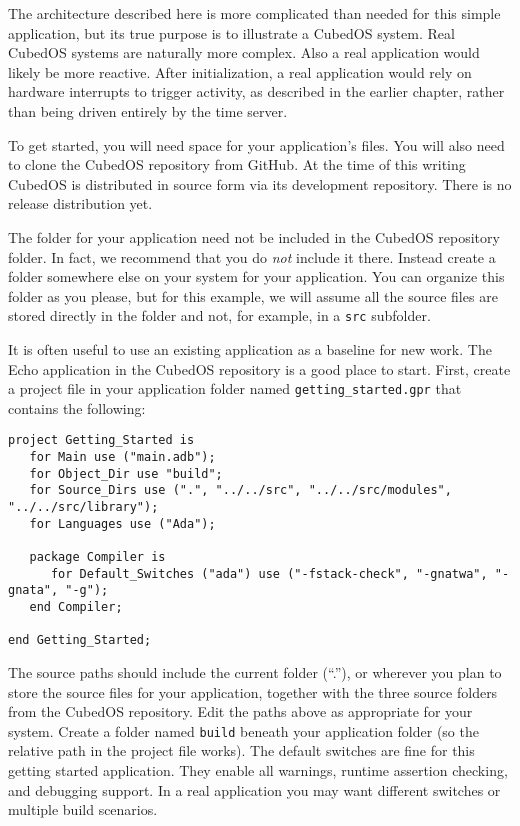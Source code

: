 \documentclass{scrreprt}
\begin{document}
The architecture described here is more complicated than needed for this simple application, but its true purpose is to illustrate a CubedOS system. Real CubedOS systems are naturally more complex. Also a real application would likely be more reactive. After initialization, a real application would rely on hardware interrupts to trigger activity, as described in the earlier chapter, rather than being driven entirely by the time server.

To get started, you will need space for your application's files. You will also need to clone the CubedOS repository from GitHub. At the time of this writing CubedOS is distributed in source form via its development repository. There is no release distribution yet.

The folder for your application need not be included in the CubedOS repository folder. In fact, we recommend that you do \emph{not} include it there. Instead create a folder somewhere else on your system for your application. You can organize this folder as you please, but for this example, we will assume all the source files are stored directly in the folder and not, for example, in a \texttt{src} subfolder.

It is often useful to use an existing application as a baseline for new work. The Echo application in the CubedOS repository is a good place to start. First, create a project file in your application folder named \texttt{getting\_started.gpr} that contains the following:
\begin{verbatim}
project Getting_Started is
   for Main use ("main.adb");
   for Object_Dir use "build";
   for Source_Dirs use (".", "../../src", "../../src/modules", "../../src/library");
   for Languages use ("Ada");

   package Compiler is
      for Default_Switches ("ada") use ("-fstack-check", "-gnatwa", "-gnata", "-g");
   end Compiler;

end Getting_Started;
\end{verbatim}

The source paths should include the current folder (``.''), or wherever you plan to store the source files for your application, together with the three source folders from the CubedOS repository. Edit the paths above as appropriate for your system. Create a folder named \texttt{build} beneath your application folder (so the relative path in the project file works). The default switches are fine for this getting started application. They enable all warnings, runtime assertion checking, and debugging support. In a real application you may want different switches or multiple build scenarios.
\end{document}
